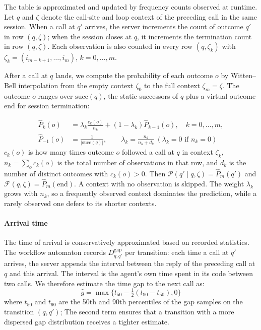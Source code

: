 The table is approximated and updated by frequency counts observed at runtime. Let $q$ and $\zeta$ denote the call-site and loop context of the preceding call in the same session. When a call at $q'$ arrives, the server increments the count of outcome $q'$ in row $(q,\zeta)$; when the session closes at $q$, it increments the termination count in row $(q,\zeta)$. Each observation is also counted in every row $(q,\zeta_k)$ with $\zeta_k=(i_{m-k+1},\dots,i_m)$, $k=0,\dots,m$.

After a call at $q$ lands, we compute the probability of each outcome $o$ by Witten--Bell interpolation from the empty context $\zeta_0$ to the full context $\zeta_m=\zeta$. The outcome $o$ ranges over $\mathrm{succ}(q)$, the static successors of $q$ plus a virtual outcome $\mathrm{end}$ for session termination:

\begin{align*}
\hat{P}_k(o) &= \lambda_k\frac{c_k(o)}{n_k}+(1-\lambda_k)\hat{P}_{k-1}(o),\quad k=0,\dots,m, \\
\hat{P}_{-1}(o) &= \frac{1}{|\mathrm{succ}(q)|},\qquad \lambda_k=\frac{n_k}{n_k+d_k}\ (\lambda_k=0 \text{ if } n_k=0)
\end{align*}
$c_k(o)$ is how many times outcome $o$ followed a call at $q$ in context $\zeta_k$, $n_k=\sum_o c_k(o)$ is the total number of observations in that row, and $d_k$ is the number of distinct outcomes with $c_k(o)>0$. Then $\mathcal{P}(q'\mid q,\zeta)=\hat{P}_m(q')$ and $\mathcal{F}(q,\zeta)=\hat{P}_m(\mathrm{end})$. A context with no observation is skipped. The weight $\lambda_k$ grows with $n_k$, so a frequently observed context dominates the prediction, while a rarely observed one defers to its shorter contexts.

\paragraph{Arrival time}
The time of arrival is conservatively approximated based on recorded statistics. The workflow automaton records $D^{\mathrm{gap}}_{q,q'}$ per transition: each time a call at $q'$ arrives, the server appends the interval between the reply of the preceding call at $q$ and this arrival. The interval is the agent's own time spent in its code between two calls. We therefore estimate the time gap to the next call as:
\[
\hat{g}= \max \{t_{50}-\tfrac{1}{2}(t_{90}-t_{50}), 0 \}
\]
where $t_{50}$ and $t_{90}$ are the 50th and 90th percentiles of the gap samples on the transition $(q,q')$; The second term ensures that a transition with a more dispersed gap distribution receives a tighter estimate. 

